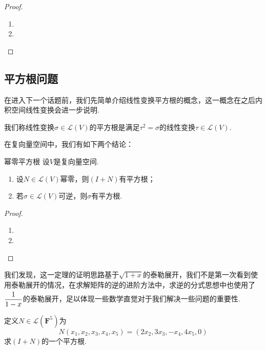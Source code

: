 \begin{proof}
    \begin{enumerate}
        \item

        \item
    \end{enumerate}
\end{proof}

\subsection{平方根问题}

在进入下一个话题前，我们先简单介绍线性变换平方根的概念，这一概念在之后内积空间线性变换会进一步说明.
\begin{definition}{}{}
    我们称线性变换$\sigma\in \mathcal{L}(V)$的平方根是满足$\tau^2=\sigma$的线性变换$\tau\in \mathcal{L}(V)$.
\end{definition}
在复向量空间中，我们有如下两个结论：
\begin{theorem}{}{幂零平方根}
    设$V$是复向量空间.
    \begin{enumerate}
        \item 设$N\in \mathcal{L}(V)$幂零，则$(I+N)$有平方根；

        \item \label{item:16:幂零平方根:2}
              若$\sigma\in \mathcal{L}(V)$可逆，则$\sigma$有平方根.
    \end{enumerate}
\end{theorem}

\begin{proof}
    \begin{enumerate}
        \item

        \item
    \end{enumerate}
\end{proof}

我们发现，这一定理的证明思路基于$\sqrt{1+x}$的泰勒展开，我们不是第一次看到使用泰勒展开的情况，在求解矩阵的逆的进阶方法中，求逆的分式思想中也使用了 $\vphantom{\cfrac{1}{1-x}}\dfrac{1}{1-x}$的泰勒展开，足以体现一些数学直觉对于我们解决一些问题的重要性.

\begin{example}{}{}
    定义$N\in \mathcal{L}(\mathbf{F}^5)$为
    \[N(x_1,x_2,x_3,x_4,x_5)=(2x_2,3x_3,-x_4,4x_5,0)\]
    求$(I+N)$的一个平方根.
\end{example}

